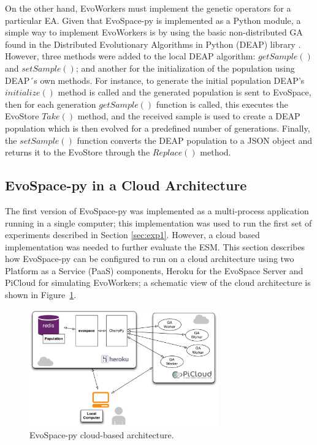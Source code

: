 On the other hand, EvoWorkers must implement the genetic operators for a particular EA. %
Given that EvoSpace-py is implemented as a Python module, a simple way to implement EvoWorkers is by using the basic non-distributed GA found in the Distributed Evolutionary Algorithms in Python (DEAP) library \cite{DEAP_JMLR2012}. 
However, three methods were added to the local DEAP algorithm: $getSample()$ and  $setSample()$; and  another for the  initialization of the population using DEAP´s own methods.
For instance, to generate the initial population DEAP's $initialize()$ method  is called and the generated population is sent to EvoSpace, then for each generation $getSample()$ function is called, this executes the EvoStore $Take()$ method, and the received sample is used to create a DEAP population which is then evolved for a predefined number of generations.
Finally, the $setSample()$ function converts the DEAP population to a JSON object and returns it to the EvoStore through the $Replace()$ method.   

\subsection{EvoSpace-py in a Cloud Architecture}
The first version of EvoSpace-py was implemented as a multi-process application running in a single computer; this implementation was used to run the first set of experiments described in Section \ref{sec:exp1}.
However, a cloud based implementation was needed to further evaluate the ESM.  %
This section describes how EvoSpace-py can be configured to run on a cloud architecture using two Platform as a Service (PaaS) components, Heroku for the EvoSpace Server and PiCloud for simulating EvoWorkers; a schematic view of the cloud architecture is shown in Figure~\ref{herokuPiCloud}.

\begin{figure}[t]
\centering
\includegraphics[width=3.2in]{herokuPiCloud.eps}
\caption{EvoSpace-py cloud-based architecture.}
\label{herokuPiCloud}
\end{figure}

